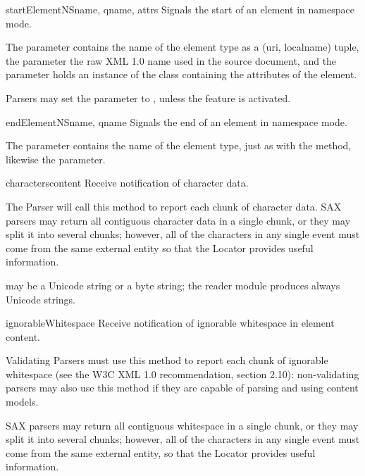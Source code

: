 \begin{methoddesc}[ContentHandler]{startElementNS}{name, qname, attrs}
  Signals the start of an element in namespace mode.

  The  parameter contains the name of the element type as a
  (uri, localname) tuple, the  parameter the raw XML 1.0
  name used in the source document, and the  parameter
  holds an instance of the  class containing the
  attributes of the element.

  Parsers may set the  parameter to , unless the
   feature is activated.
\end{methoddesc}

\begin{methoddesc}[ContentHandler]{endElementNS}{name, qname}
  Signals the end of an element in namespace mode.

  The  parameter contains the name of the element type, just
  as with the  method, likewise the
   parameter.
\end{methoddesc}

\begin{methoddesc}[ContentHandler]{characters}{content}
  Receive notification of character data.
        
  The Parser will call this method to report each chunk of character
  data. SAX parsers may return all contiguous character data in a
  single chunk, or they may split it into several chunks; however, all
  of the characters in any single event must come from the same
  external entity so that the Locator provides useful information.

   may be a Unicode string or a byte string; the
   reader module produces always Unicode strings.

\end{methoddesc}

\begin{methoddesc}[ContentHandler]{ignorableWhitespace}{}
  Receive notification of ignorable whitespace in element content.
        
  Validating Parsers must use this method to report each chunk
  of ignorable whitespace (see the W3C XML 1.0 recommendation,
  section 2.10): non-validating parsers may also use this method
  if they are capable of parsing and using content models.
  
  SAX parsers may return all contiguous whitespace in a single
  chunk, or they may split it into several chunks; however, all
  of the characters in any single event must come from the same
  external entity, so that the Locator provides useful
  information.
\end{methoddesc}

